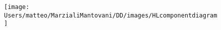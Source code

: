 \begin{figure}
	\centering
	\texttt{[image: Users/matteo/MarzialiMantovani/DD/images/HLcomponentdiagram]}
	\caption[High-level component diagram]{}
	\caption{}
	\label{fig:hlcomponentdiagram}
\end{figure}
